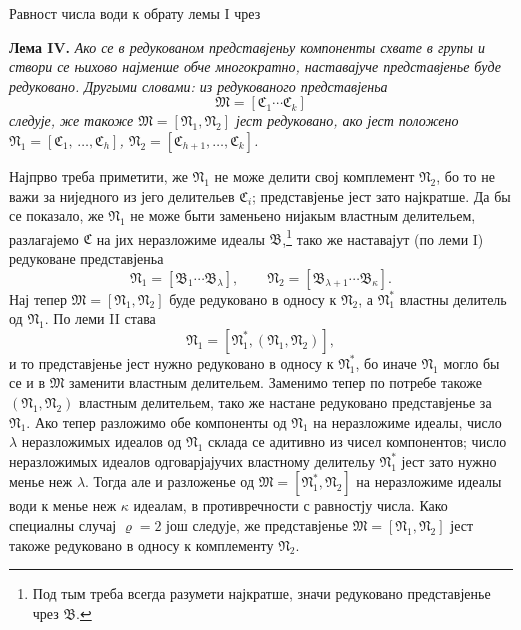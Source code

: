 ﻿\documentclass[11pt]{article}
\newcommand{\ideal}[1]{\mathfrak{#1}}
\begin{document}
Равност числа води к обрату лемы I чрез

\textbf{Лема IV.} \emph{Ако се в редукованом представјеньу компоненты схвате в групы и створи се њихово најменше обче многократно, наставајуче представјенье буде редуковано. Другыми словами: из редукованого представјеньа}
\[
 \ideal M=[\ideal C_1\cdots\ideal C_k]
\]
\emph{следује, же такоже \(\ideal M=[\ideal N_1,\ideal N_2]\) јест редуковано, ако јест положено \(\ideal N_1=[\ideal C_1,\,\ldots,\ideal C_h]\), \(\ideal N_2=[\ideal C_{h+1},\ldots,\ideal C_k]\).}

Најпрво треба приметити, же \(\ideal N_1\) не може делити свој комплемент \(\ideal N_2\), бо то не важи за ниједного из јего делительев \(\ideal C_i\); представјенье јест зато најкратше. Да бы се показало, же \(\ideal N_1\) не може быти заменьено нијакым властным делительем, разлагајемо \(\ideal C\) на јих неразложиме идеалы \(\ideal B\),\footnote{Под тым треба всегда разумети најкратше, значи редуковано представјенье чрез \(\ideal B\).} тако же наставајут (по леми I) редуковане представјеньа
\[
 \ideal N_1=[\ideal B_1\cdots\ideal B_\lambda],
 \qquad
 \ideal N_2=[\ideal B_{\lambda+1}\cdots\ideal B_\kappa].
\]
Нај тепер \(\ideal M=[\ideal N_1,\ideal N_2]\) буде редуковано в односу к \(\ideal N_2\), а \(\ideal N_1^*\) властны делитель од \(\ideal N_1\). По леми II става
\[
 \ideal N_1=[\ideal N_1^*,(\ideal N_1,\ideal N_2)],
\]
и то представјенье јест нужно редуковано в односу к \(\ideal N_1^*\), бо иначе \(\ideal N_1\) могло бы се и в \(\ideal M\) заменити властным делительем. Заменимо тепер по потребе такоже \((\ideal N_1,\ideal N_2)\) властным делительем, тако же настане редуковано представјенье за \(\ideal N_1\). Ако тепер разложимо обе компоненты од \(\ideal N_1\) на неразложиме идеалы, число \(\lambda\) неразложимых идеалов од \(\ideal N_1\) склада се адитивно из чисел компонентов; число неразложимых идеалов одговарјајучих властному делительу \(\ideal N_1^*\) јест зато нужно менье неж \(\lambda\). Тогда але и разложенье од \(\ideal M=[\ideal N_1^*,\ideal N_2]\) на неразложиме идеалы води к менье неж \(\kappa\) идеалам, в противречности с равностју числа. Како специалны случај \(\varrho=2\) још следује, же представјенье \(\ideal M=[\ideal N_1,\ideal N_2]\) јест такоже редуковано в односу к комплементу \(\ideal N_2\).

\clearpage
\end{document}
